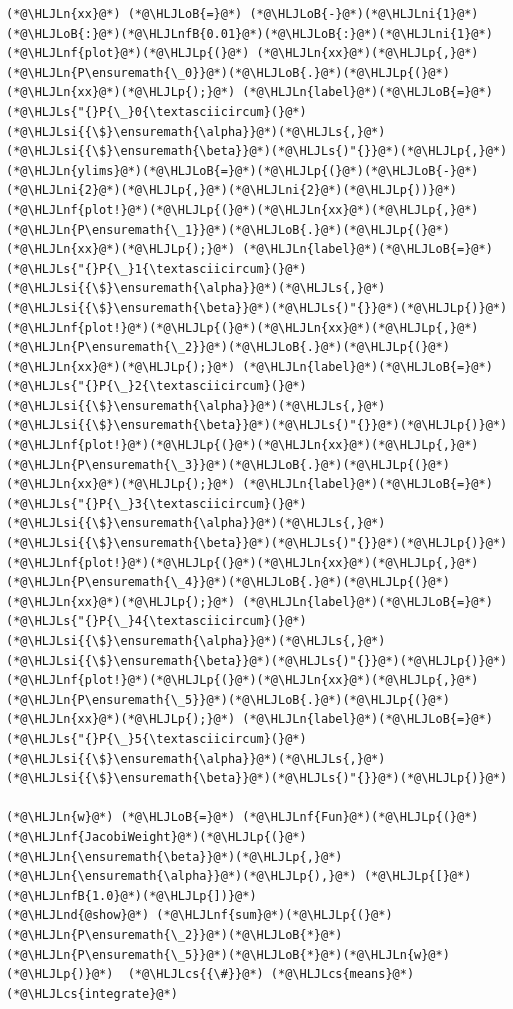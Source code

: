 \documentclass[12pt,a4paper]{article}
\newcommand{\HLJLn}[1]{#1}
\newcommand{\HLJLnd}[1]{\textcolor[RGB]{214,102,97}{#1}}
\newcommand{\HLJLnf}[1]{\textcolor[RGB]{66,102,213}{#1}}
\newcommand{\HLJLs}[1]{\textcolor[RGB]{201,61,57}{#1}}
\newcommand{\HLJLsi}[1]{#1}
\newcommand{\HLJLnfB}[1]{\textcolor[RGB]{59,151,46}{#1}}
\newcommand{\HLJLni}[1]{\textcolor[RGB]{59,151,46}{#1}}
\newcommand{\HLJLoB}[1]{\textcolor[RGB]{102,102,102}{\textbf{#1}}}
\newcommand{\HLJLp}[1]{#1}
\newcommand{\HLJLcs}[1]{\textcolor[RGB]{153,153,119}{\textit{#1}}}
\begin{document}
\begin{lstlisting}
(*@\HLJLn{xx}@*) (*@\HLJLoB{=}@*) (*@\HLJLoB{-}@*)(*@\HLJLni{1}@*)(*@\HLJLoB{:}@*)(*@\HLJLnfB{0.01}@*)(*@\HLJLoB{:}@*)(*@\HLJLni{1}@*)
(*@\HLJLnf{plot}@*)(*@\HLJLp{(}@*) (*@\HLJLn{xx}@*)(*@\HLJLp{,}@*) (*@\HLJLn{P\ensuremath{\_0}}@*)(*@\HLJLoB{.}@*)(*@\HLJLp{(}@*)(*@\HLJLn{xx}@*)(*@\HLJLp{);}@*) (*@\HLJLn{label}@*)(*@\HLJLoB{=}@*)(*@\HLJLs{"{}P{\_}0{\textasciicircum}(}@*)(*@\HLJLsi{{\$}\ensuremath{\alpha}}@*)(*@\HLJLs{,}@*)(*@\HLJLsi{{\$}\ensuremath{\beta}}@*)(*@\HLJLs{)"{}}@*)(*@\HLJLp{,}@*) (*@\HLJLn{ylims}@*)(*@\HLJLoB{=}@*)(*@\HLJLp{(}@*)(*@\HLJLoB{-}@*)(*@\HLJLni{2}@*)(*@\HLJLp{,}@*)(*@\HLJLni{2}@*)(*@\HLJLp{))}@*)
(*@\HLJLnf{plot!}@*)(*@\HLJLp{(}@*)(*@\HLJLn{xx}@*)(*@\HLJLp{,}@*) (*@\HLJLn{P\ensuremath{\_1}}@*)(*@\HLJLoB{.}@*)(*@\HLJLp{(}@*)(*@\HLJLn{xx}@*)(*@\HLJLp{);}@*) (*@\HLJLn{label}@*)(*@\HLJLoB{=}@*)(*@\HLJLs{"{}P{\_}1{\textasciicircum}(}@*)(*@\HLJLsi{{\$}\ensuremath{\alpha}}@*)(*@\HLJLs{,}@*)(*@\HLJLsi{{\$}\ensuremath{\beta}}@*)(*@\HLJLs{)"{}}@*)(*@\HLJLp{)}@*)
(*@\HLJLnf{plot!}@*)(*@\HLJLp{(}@*)(*@\HLJLn{xx}@*)(*@\HLJLp{,}@*) (*@\HLJLn{P\ensuremath{\_2}}@*)(*@\HLJLoB{.}@*)(*@\HLJLp{(}@*)(*@\HLJLn{xx}@*)(*@\HLJLp{);}@*) (*@\HLJLn{label}@*)(*@\HLJLoB{=}@*)(*@\HLJLs{"{}P{\_}2{\textasciicircum}(}@*)(*@\HLJLsi{{\$}\ensuremath{\alpha}}@*)(*@\HLJLs{,}@*)(*@\HLJLsi{{\$}\ensuremath{\beta}}@*)(*@\HLJLs{)"{}}@*)(*@\HLJLp{)}@*)
(*@\HLJLnf{plot!}@*)(*@\HLJLp{(}@*)(*@\HLJLn{xx}@*)(*@\HLJLp{,}@*) (*@\HLJLn{P\ensuremath{\_3}}@*)(*@\HLJLoB{.}@*)(*@\HLJLp{(}@*)(*@\HLJLn{xx}@*)(*@\HLJLp{);}@*) (*@\HLJLn{label}@*)(*@\HLJLoB{=}@*)(*@\HLJLs{"{}P{\_}3{\textasciicircum}(}@*)(*@\HLJLsi{{\$}\ensuremath{\alpha}}@*)(*@\HLJLs{,}@*)(*@\HLJLsi{{\$}\ensuremath{\beta}}@*)(*@\HLJLs{)"{}}@*)(*@\HLJLp{)}@*)
(*@\HLJLnf{plot!}@*)(*@\HLJLp{(}@*)(*@\HLJLn{xx}@*)(*@\HLJLp{,}@*) (*@\HLJLn{P\ensuremath{\_4}}@*)(*@\HLJLoB{.}@*)(*@\HLJLp{(}@*)(*@\HLJLn{xx}@*)(*@\HLJLp{);}@*) (*@\HLJLn{label}@*)(*@\HLJLoB{=}@*)(*@\HLJLs{"{}P{\_}4{\textasciicircum}(}@*)(*@\HLJLsi{{\$}\ensuremath{\alpha}}@*)(*@\HLJLs{,}@*)(*@\HLJLsi{{\$}\ensuremath{\beta}}@*)(*@\HLJLs{)"{}}@*)(*@\HLJLp{)}@*)
(*@\HLJLnf{plot!}@*)(*@\HLJLp{(}@*)(*@\HLJLn{xx}@*)(*@\HLJLp{,}@*) (*@\HLJLn{P\ensuremath{\_5}}@*)(*@\HLJLoB{.}@*)(*@\HLJLp{(}@*)(*@\HLJLn{xx}@*)(*@\HLJLp{);}@*) (*@\HLJLn{label}@*)(*@\HLJLoB{=}@*)(*@\HLJLs{"{}P{\_}5{\textasciicircum}(}@*)(*@\HLJLsi{{\$}\ensuremath{\alpha}}@*)(*@\HLJLs{,}@*)(*@\HLJLsi{{\$}\ensuremath{\beta}}@*)(*@\HLJLs{)"{}}@*)(*@\HLJLp{)}@*)

(*@\HLJLn{w}@*) (*@\HLJLoB{=}@*) (*@\HLJLnf{Fun}@*)(*@\HLJLp{(}@*)(*@\HLJLnf{JacobiWeight}@*)(*@\HLJLp{(}@*)(*@\HLJLn{\ensuremath{\beta}}@*)(*@\HLJLp{,}@*)(*@\HLJLn{\ensuremath{\alpha}}@*)(*@\HLJLp{),}@*) (*@\HLJLp{[}@*)(*@\HLJLnfB{1.0}@*)(*@\HLJLp{])}@*)
(*@\HLJLnd{@show}@*) (*@\HLJLnf{sum}@*)(*@\HLJLp{(}@*)(*@\HLJLn{P\ensuremath{\_2}}@*)(*@\HLJLoB{*}@*)(*@\HLJLn{P\ensuremath{\_5}}@*)(*@\HLJLoB{*}@*)(*@\HLJLn{w}@*)(*@\HLJLp{)}@*)  (*@\HLJLcs{{\#}}@*) (*@\HLJLcs{means}@*) (*@\HLJLcs{integrate}@*)
\end{lstlisting}
\end{document}
